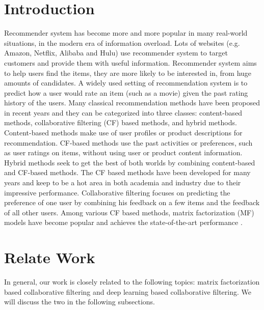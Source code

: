 \documentclass{sig-alternate-05-2015}
\begin{document}
\section{Introduction}
Recommender system has become more and more popular in many real-world situations, in the modern era of information overload.
Lots of websites (e.g. Amazon, Netflix, Alibaba and Hulu) use recommender system to target customers and provide them with useful information.
Recommender system aims to help users find the items, they are more likely to be interested in, from huge amounts of candidates.
A widely used setting of recommendation system is to predict how a user would rate an item (such as a movie) given the past rating history of the users.
Many classical recommendation methods have been proposed in recent years and they can be categorized into three classes:
content-based methods, collaborative filtering (CF) based methods, and hybrid methods.
Content-based methods \cite{pazzani2007content} make use of user profiles or product descriptions for recommendation.
CF-based methods \cite{su2009survey} use the past activities or preferences, such as user ratings on items, without using user or product content information.
Hybrid methods \cite{wang2011collaborative} seek to get the best of both worlds by combining content-based and CF-based methods.
The CF based methods have been developed for many years and keep to be a hot area in both academia and industry due to their impressive performance.
Collaborative filtering focuses on predicting the preference of one user by combining his feedback on a few items and the feedback of all other users.
Among various CF based methods, matrix factorization (MF) models have become popular and achieves the state-of-the-art performance \cite{koren2009matrix}.

\section{Relate Work}
In general, our work is closely related to the following topics:
matrix factorization based collaborative filtering and deep learning based collaborative filtering.
We will discuss the two in the following subsections.
\end{document}
